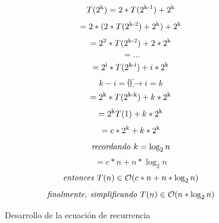 \documentclass[12pt,twoside]{article}
\begin{document}
\begin{figure}[ht]
    \centering
    \begin{equation}
        T(2\textsuperscript{k}) = 2*T(2\textsuperscript{k-1})+2\textsuperscript{k}
    \end{equation}
    \begin{equation}
        =2*(2*T(2\textsuperscript{k-2}) + 2\textsuperscript{k}) + 2\textsuperscript{k}
    \end{equation}
    \begin{equation}
        =2\textsuperscript{2}*T(2\textsuperscript{k-2})+2*2\textsuperscript{k}
    \end{equation}
    \begin{equation}
        = \dots
    \end{equation}
    \begin{equation}
        =2\textsuperscript{i}*T(2\textsuperscript{k-i})+i*2\textsuperscript{k}
    \end{equation}
    \begin{equation}
        \dots
    \end{equation}
    \begin{equation}
        k-i = 0 \longrightarrow i = k
    \end{equation}
    \begin{equation}
        \dots
    \end{equation}
    \begin{equation}
        =2\textsuperscript{k}*T(2\textsuperscript{k-k})+k*2\textsuperscript{k}
    \end{equation}
    \begin{equation}
        =2\textsuperscript{k}T(1)+k*2\textsuperscript{k}
    \end{equation}
    \begin{equation}
        =c*2\textsuperscript{k}+k*2\textsuperscript{k}
    \end{equation}
    \begin{equation}
        \text{\textit{recordando }} k = \log_{2} n
    \end{equation}
    \begin{equation}
        =c*n+n*\log_{2} n
    \end{equation}
    \begin{equation}
        \text{\textit{entonces }} T(n) \in \mathcal{O}(c*n + n*\log_{2} n)
    \end{equation}
    \begin{equation}
        \text{\textit{finalmente, simplificando }} T(n) \in \mathcal{O}(n*\log_{2} n)
    \end{equation}
    \caption{Desarrollo de la ecuaci\'on de recurrencia}
    \label{eq:desarrollo_recurrencia}
\end{figure}
\end{document}
